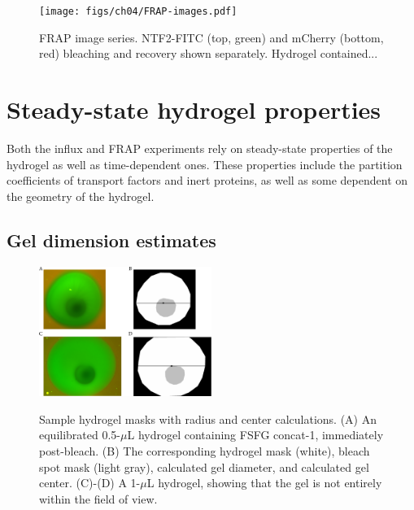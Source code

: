 \begin{figure} 
\caption[FRAP image series.]{FRAP image series. NTF2-FITC (top, green) and mCherry (bottom, red) bleaching and recovery shown separately.  Hydrogel contained... }
\centering
\texttt{[image: figs/ch04/FRAP-images.pdf]}
\label{fig:frap-images}
\end{figure} 

\section{Steady-state hydrogel properties}

Both the influx and FRAP experiments rely on steady-state properties of the hydrogel as well as time-dependent ones.  These properties include the partition coefficients of transport factors and inert proteins, as well as some dependent on the geometry of the hydrogel.

\subsection{Gel dimension estimates}
\label{sec:gel-dim}

\begin{figure} 
\caption[Hydrogel masks with radius and center calculations.]{Sample hydrogel masks with radius and center calculations.  (A) An equilibrated 0.5-$\mu$L hydrogel containing FSFG concat-1, immediately post-bleach. (B) The corresponding hydrogel mask (white), bleach spot mask (light gray), calculated gel diameter, and calculated gel center. (C)-(D) A 1-$\mu$L hydrogel, showing that the gel is not entirely within the field of view.}
\centering
\includegraphics[width=0.5\textwidth]{figs/ch04/geometry.pdf}
\label{fig:masks}
\end{figure} 

